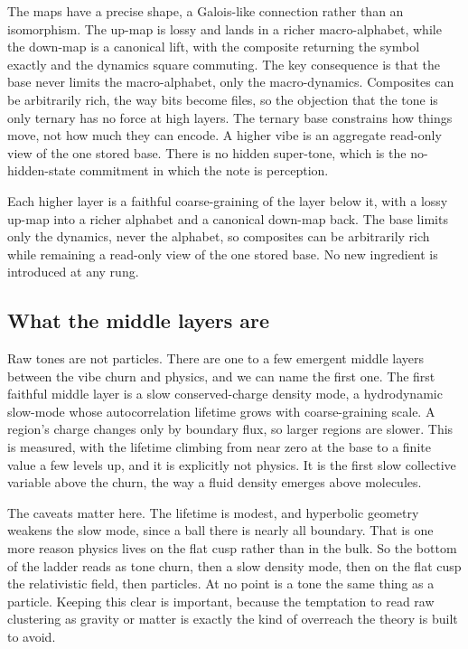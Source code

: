 The maps have a precise shape, a Galois-like connection rather than an isomorphism. The up-map is lossy and lands in a richer macro-alphabet, while the down-map is a canonical lift, with the composite returning the symbol exactly and the dynamics square commuting. The key consequence is that the base never limits the macro-alphabet, only the macro-dynamics. Composites can be arbitrarily rich, the way bits become files, so the objection that the tone is only ternary has no force at high layers. The ternary base constrains how things move, not how much they can encode. A higher vibe is an aggregate read-only view of the one stored base. There is no hidden super-tone, which is the no-hidden-state commitment in which the note is perception.

\begin{principle}
Each higher layer is a faithful coarse-graining of the layer below it, with a lossy up-map into a richer alphabet and a canonical down-map back. The base limits only the dynamics, never the alphabet, so composites can be arbitrarily rich while remaining a read-only view of the one stored base. No new ingredient is introduced at any rung.
\end{principle}

\subsection{What the middle layers are}

Raw tones are not particles. There are one to a few emergent middle layers between the vibe churn and physics, and we can name the first one. The first faithful middle layer is a slow conserved-charge density mode, a hydrodynamic slow-mode whose autocorrelation lifetime grows with coarse-graining scale. A region's charge changes only by boundary flux, so larger regions are slower. This is measured, with the lifetime climbing from near zero at the base to a finite value a few levels up, and it is explicitly not physics. It is the first slow collective variable above the churn, the way a fluid density emerges above molecules.

The caveats matter here. The lifetime is modest, and hyperbolic geometry weakens the slow mode, since a ball there is nearly all boundary. That is one more reason physics lives on the flat cusp rather than in the bulk. So the bottom of the ladder reads as tone churn, then a slow density mode, then on the flat cusp the relativistic field, then particles. At no point is a tone the same thing as a particle. Keeping this clear is important, because the temptation to read raw clustering as gravity or matter is exactly the kind of overreach the theory is built to avoid.

